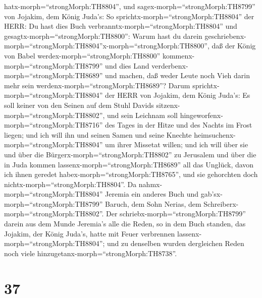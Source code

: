 hatx-morph=``strongMorph:TH8804'',  und
sagex-morph=``strongMorph:TH8799'' von Jojakim, dem König Juda's: So
sprichtx-morph=``strongMorph:TH8804'' der HERR: Du hast dies Buch
verbranntx-morph=``strongMorph:TH8804'' und
gesagtx-morph=``strongMorph:TH8800'': Warum hast du darein
geschriebenx-morph=``strongMorph:TH8804''x-morph=``strongMorph:TH8800'',
daß der König von Babel werdex-morph=``strongMorph:TH8800''
kommenx-morph=``strongMorph:TH8799'' und dies Land
verderbenx-morph=``strongMorph:TH8689'' und machen, daß weder Leute noch
Vieh darin mehr sein werdenx-morph=``strongMorph:TH8689''? 
Darum sprichtx-morph=``strongMorph:TH8804'' der HERR von Jojakim, dem
König Juda's: Es soll keiner von den Seinen auf dem Stuhl Davids
sitzenx-morph=``strongMorph:TH8802'', und sein Leichnam soll
hingeworfenx-morph=``strongMorph:TH8716'' des Tages in der Hitze und des
Nachts im Frost liegen;  und ich will ihn und seinen Samen
und seine Knechte heimsuchenx-morph=``strongMorph:TH8804'' um ihrer
Missetat willen; und ich will über sie und über die
Bürgerx-morph=``strongMorph:TH8802'' zu Jerusalem und über die in Juda
kommen lassenx-morph=``strongMorph:TH8689'' all das Unglück, davon ich
ihnen geredet habex-morph=``strongMorph:TH8765'', und sie gehorchten
doch nichtx-morph=``strongMorph:TH8804''.  Da
nahmx-morph=``strongMorph:TH8804'' Jeremia ein anderes Buch und
gab'sx-morph=``strongMorph:TH8799'' Baruch, dem Sohn Nerias, dem
Schreiberx-morph=``strongMorph:TH8802''. Der
schriebx-morph=``strongMorph:TH8799'' darein aus dem Munde Jeremia's
alle die Reden, so in dem Buch standen, das Jojakim, der König Juda's,
hatte mit Feuer verbrennen lassenx-morph=``strongMorph:TH8804''; und zu
denselben wurden dergleichen Reden noch viele
hinzugetanx-morph=``strongMorph:TH8738''.

\hypertarget{section-36}{%
\section{37}\label{section-36}}

